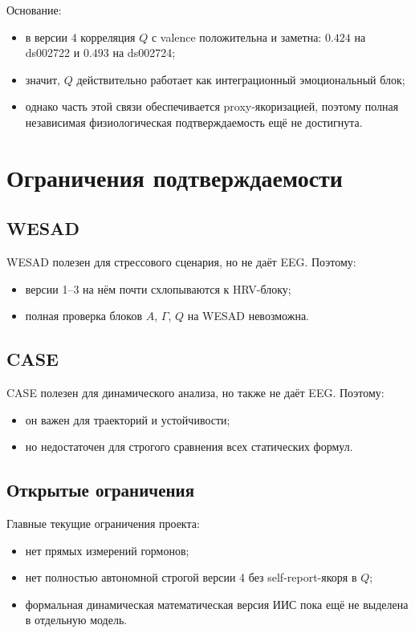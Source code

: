 \documentclass[12pt,a4paper]{article}
\begin{document}
Основание:
\begin{itemize}[leftmargin=1.25cm]
    \item в версии 4 корреляция $Q$ с valence положительна и заметна: $0.424$ на ds002722 и $0.493$ на ds002724;
    \item значит, $Q$ действительно работает как интеграционный эмоциональный блок;
    \item однако часть этой связи обеспечивается proxy-якоризацией, поэтому полная независимая физиологическая подтверждаемость ещё не достигнута.
\end{itemize}

\section{Ограничения подтверждаемости}
\subsection{WESAD}
WESAD полезен для стрессового сценария, но не даёт EEG. Поэтому:
\begin{itemize}[leftmargin=1.25cm]
    \item версии 1--3 на нём почти схлопываются к HRV-блоку;
    \item полная проверка блоков $A$, $\Gamma$, $Q$ на WESAD невозможна.
\end{itemize}

\subsection{CASE}
CASE полезен для динамического анализа, но также не даёт EEG. Поэтому:
\begin{itemize}[leftmargin=1.25cm]
    \item он важен для траекторий и устойчивости;
    \item но недостаточен для строгого сравнения всех статических формул.
\end{itemize}

\subsection{Открытые ограничения}
Главные текущие ограничения проекта:
\begin{itemize}[leftmargin=1.25cm]
    \item нет прямых измерений гормонов;
    \item нет полностью автономной строгой версии 4 без self-report-якоря в $Q$;
    \item формальная динамическая математическая версия ИИС пока ещё не выделена в отдельную модель.
\end{itemize}
\end{document}
